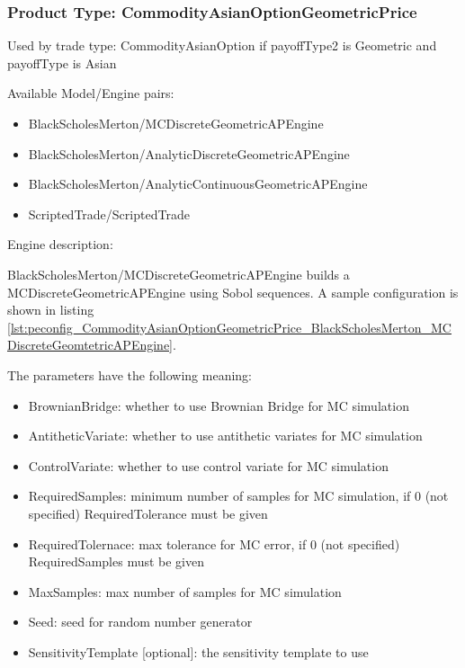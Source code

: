 \subsubsection{Product Type: CommodityAsianOptionGeometricPrice}

Used by trade type: CommodityAsianOption if payoffType2 is Geometric and payoffType is Asian

Available Model/Engine pairs:

\begin{itemize}
  \item BlackScholesMerton/MCDiscreteGeometricAPEngine
  \item BlackScholesMerton/AnalyticDiscreteGeometricAPEngine
  \item BlackScholesMerton/AnalyticContinuousGeometricAPEngine
  \item ScriptedTrade/ScriptedTrade
\end{itemize}

Engine description:

BlackScholesMerton/MCDiscreteGeometricAPEngine builds a MCDiscreteGeometricAPEngine using Sobol sequences. A sample
configuration is shown in listing
\ref{lst:peconfig_CommodityAsianOptionGeometricPrice_BlackScholesMerton_MCDiscreteGeomtetricAPEngine}.

The parameters have the following meaning:

\begin{itemize}
\item BrownianBridge: whether to use Brownian Bridge for MC simulation
\item AntitheticVariate: whether to use antithetic variates for MC simulation
\item ControlVariate: whether to use control variate for MC simulation
\item RequiredSamples: minimum number of samples for MC simulation, if 0 (not specified) RequiredTolerance must be given
\item RequiredTolernace: max tolerance for MC error, if 0 (not specified) RequiredSamples must be given
\item MaxSamples: max number of samples for MC simulation
\item Seed: seed for random number generator
\item SensitivityTemplate [optional]: the sensitivity template to use 
\end{itemize}

